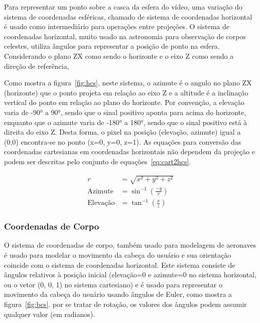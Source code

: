 {	Para representar um ponto sobre a casca da esfera do vídeo, uma variação do sistema de coordenadas esféricas, chamado de sistema de coordenadas horizontal é usado como intermediário para operações entre projeções. O sistema de coordenadas horizontal, muito usado na astronomia para observação de corpos celestes, utiliza ângulos para representar a posição de ponto na esfera. Considerando o plano ZX como sendo o horizonte e o eixo Z como sendo a direção de referência, 
	
	Como mostra a figura~\ref{fig:hcs}, neste sistema, o azimute é o angulo no plano ZX (horizonte) que o ponto projeta em relação ao eixo Z e a altitude é a inclinação vertical do ponto em relação ao plano do horizonte. Por convenção, a elevação varia de -90° a 90°, sendo que o sinal positivo aponta para acima do horizonte, enquanto que o azimute varia de -180° a 180°, sendo que o sinal positivo está à direita do eixo Z. Desta forma, o pixel na posição (elevação, azimute) igual a (0,0) encontra-se no ponto (x=0, y=0, z=1). As equações para conversão das coordenadas cartesianas em coordenadas horizontais não dependem da projeção e podem ser descritas pelo conjunto de equações~\ref{eq:cart2hcs}.
	
	\begin{equation}
	\label{eq:cart2hcs}
	\begin{split}
		r &= \sqrt{x^2+y^2+z^2} \\
		\text{Azimute} &=\sin^{-1}\left(\frac{-y}{r}\right) \\
		\text{Elevação} &=\tan^{-1}\left(\frac{x}{z}\right)
	\end{split}		
	\end{equation}
	
	
	\subsubsection{Coordenadas de Corpo}
	
	O sistema de coordenadas de corpo, também usado para modelagem de aeronaves é usado para modelar o movimento da cabeça do usuário e sua orientação coincide com o sistema de coordenadas horizontal. Este sistema consiste de ângulos relativos à posição inicial (elevação=0 e azimute=0 no sistema horizontal, ou o vetor (0, 0, 1) no sistema cartesiano) e é usado para representar o movimento da cabeça do usuário usando ângulos de Euler, como mostra a figura~\ref{fig:bcs}. por se tratar de rotação, os valores dos ângulos podem assumir qualquer valor (em radianos).
	
}
